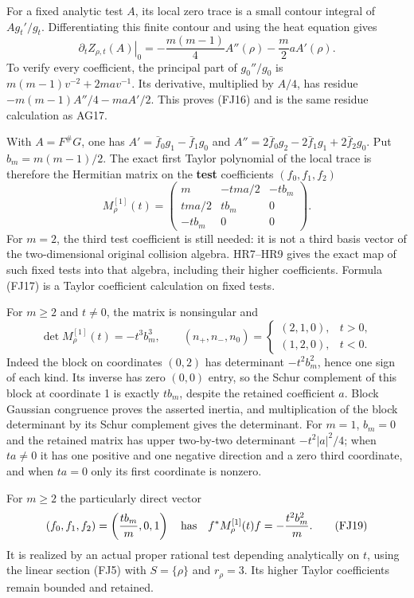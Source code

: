 \documentclass[
  10pt,
  a4paper,
]{article}
\begin{document}
For a fixed analytic test \(A\), its local zero trace is a small contour
integral of \(Ag_t'/g_t\). Differentiating this finite contour and using
the heat equation gives \[
\left.\partial_t Z_{\rho,t}(A)\right|_0
 =-\frac{m(m-1)}4 A''(\rho)-\frac m2aA'(\rho).
\tag{FJ16}
\] To verify every coefficient, the principal part of \(g_0''/g_0\) is
\(m(m-1)v^{-2}+2ma v^{-1}\). Its derivative, multiplied by \(A/4\), has
residue \(-m(m-1)A''/4-maA'/2\). This proves (FJ16) and is the same
residue calculation as AG17.

With \(A=F^\#G\), one has \(A'=\bar f_0g_1-\bar f_1g_0\) and
\(A''=2\bar f_0g_2-2\bar f_1g_1+2\bar f_2g_0\). Put \(b_m=m(m-1)/2\).
The exact first Taylor polynomial of the local trace is therefore the
Hermitian matrix on the \textbf{test} coefficients \((f_0,f_1,f_2)\) \[
M^{[1]}_\rho(t)=
\begin{pmatrix}
m&-tma/2&-tb_m\\
tma/2&tb_m&0\\
-tb_m&0&0
\end{pmatrix}.
\tag{FJ17}
\] For \(m=2\), the third test coefficient is still needed: it is not a
third basis vector of the two-dimensional original collision algebra.
HR7--HR9 gives the exact map of such fixed tests into that algebra,
including their higher coefficients. Formula (FJ17) is a Taylor
coefficient calculation on fixed tests.

For \(m\ge2\) and \(t\ne0\), the matrix is nonsingular and \[
\det M^{[1]}_\rho(t)=-t^3b_m^3,\qquad
(n_+,n_-,n_0)=
\begin{cases}(2,1,0),&t>0,\\(1,2,0),&t<0.\end{cases}
\tag{FJ18}
\] Indeed the block on coordinates \((0,2)\) has determinant
\(-t^2b_m^2\), hence one sign of each kind. Its inverse has zero
\((0,0)\) entry, so the Schur complement of this block at coordinate 1
is exactly \(tb_m\), despite the retained coefficient \(a\). Block
Gaussian congruence proves the asserted inertia, and multiplication of
the block determinant by its Schur complement gives the determinant. For
\(m=1\), \(b_m=0\) and the retained matrix has upper two-by-two
determinant \(-t^2|a|^2/4\); when \(ta\ne0\) it has one positive and one
negative direction and a zero third coordinate, and when \(ta=0\) only
its first coordinate is nonzero.

For \(m\ge2\) the particularly direct vector \[
(f_0,f_1,f_2)=\left(\frac{tb_m}{m},0,1\right)
\quad\hbox{has}\quad
f^*M^{[1]}_\rho(t)f=-\frac{t^2b_m^2}{m}.
\tag{FJ19}
\] It is realized by an actual proper rational test depending
analytically on \(t\), using the linear section (FJ5) with
\(S=\{\rho\}\) and \(r_\rho=3\). Its higher Taylor coefficients remain
bounded and retained.
\end{document}
